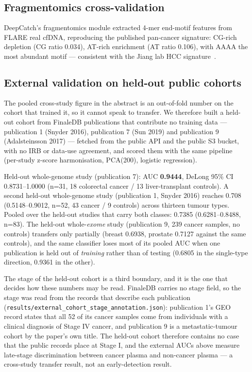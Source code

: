 \documentclass[11pt]{article}
\begin{document}
\subsection{Fragmentomics cross-validation}

DeepCatch's fragmentomics module extracted 4-mer end-motif features from FLARE real cfDNA, reproducing the published pan-cancer signature: CG-rich depletion (CG ratio 0.034), AT-rich enrichment (AT ratio 0.106), with AAAA the most abundant motif --- consistent with the Jiang lab HCC signature~\cite{jiang2020}.

\subsection{External validation on held-out public cohorts}

The pooled cross-study figure in the abstract is an out-of-fold number on the cohort that trained it, so it cannot speak to transfer. We therefore built a held-out cohort from FinaleDB publications that contribute no training data --- publication 1 (Snyder 2016), publication 7 (Sun 2019) and publication 9 (Adalsteinsson 2017) --- fetched from the public API and the public S3 bucket, with no IRB or data-use agreement, and scored them with the same pipeline (per-study z-score harmonisation, PCA(200), logistic regression).

Held-out whole-genome study (publication 7): AUC \textbf{0.9444}, DeLong 95\% CI 0.8731--1.0000 (n=31, 18 colorectal cancer / 13 liver-transplant controls). A second held-out whole-genome study (publication 1, Snyder 2016) reaches 0.708 (0.5148--0.9012, n=52, 43 cancer / 9 controls) across thirteen tumour types. Pooled over the held-out studies that carry both classes: 0.7385 (0.6281--0.8488, n=83). The held-out whole-\emph{exome} study (publication 9, 239 cancer samples, no controls) transfers only partially (breast 0.6938, prostate 0.7127 against the same controls), and the same classifier loses most of its pooled AUC when one publication is held out of \emph{training} rather than of testing (0.6805 in the single-type direction, 0.9361 in the other).

The stage of the held-out cohort is a third boundary, and it is the
one that decides how these numbers may be read. FinaleDB carries no
stage field, so the stage was read from the records that describe each
publication (\texttt{results/external\_cohort\_stage\_annotation.json}):
publication 1's GEO record states that all 52 of its cancer samples come
from individuals with a clinical diagnosis of Stage IV cancer, and
publication 9 is a metastatic-tumour cohort by the paper's own title.
The held-out cohort therefore contains no case that the public records
place at Stage I, and the external AUCs above measure late-stage
discrimination between cancer plasma and non-cancer plasma --- a
cross-study transfer result, not an early-detection result.
\end{document}
